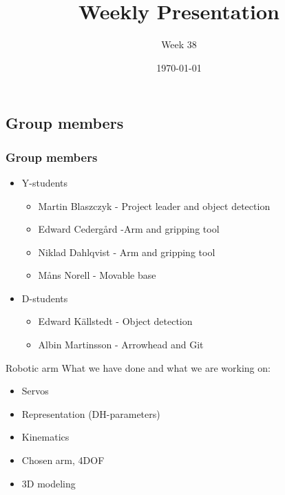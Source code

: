 \documentclass{beamer}
\title{Weekly Presentation}
\subtitle{Week 38}
\author{}
\institute{Luleå University of Technology}
\date{\today}
\begin{document}
\begin{frame}
    \titlepage
\end{frame}




\begin{frame}
    \subsection{Group members}
    \frametitle{Group members }
    \begin{itemize}
        \item Y-students
        \begin{itemize}
            \item Martin Blaszczyk - Project leader and object detection
            \item Edward Cedergård -Arm and gripping tool
            \item Niklad Dahlqvist -  Arm and gripping tool
            \item Måns Norell - Movable base
        \end{itemize}
        \item D-students
        \begin{itemize}
            \item Edward Källstedt - Object detection
            \item Albin Martinsson - Arrowhead and Git
        \end{itemize}  
    \end{itemize}
\end{frame}




\begin{frame}{Robotic arm}
What we have done and what we are working on:
    \begin{itemize}
        \item Servos
        \item Representation (DH-parameters)
        \item Kinematics
        \item Chosen arm, 4DOF
        \item 3D modeling
    \end{itemize}
\end{frame}


\end{document}
